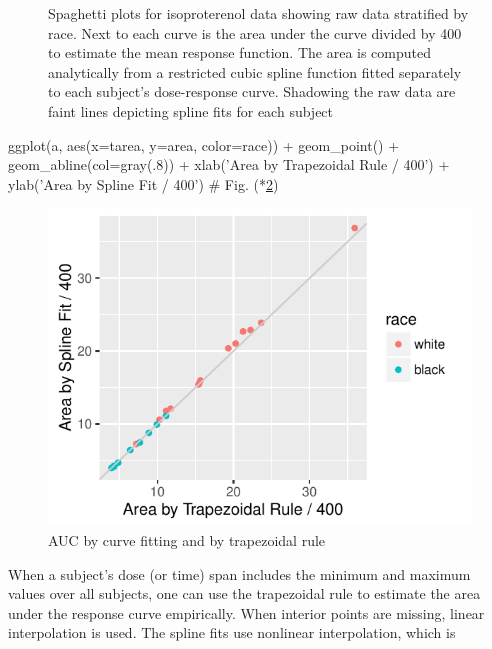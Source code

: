 \begin{Schunk}
\begin{figure}[htbp]
\caption[Spaghetti plots for isoproterenol data]{Spaghetti plots for isoproterenol data showing raw data stratified by race.  Next to each curve is the area under the curve divided by 400 to estimate the mean response function.  The area is computed analytically from a restricted cubic spline function fitted separately to each subject's dose-response curve.  Shadowing the raw data are faint lines depicting spline fits for each subject}\label{fig:serial-spag}
\end{figure}
\end{Schunk}

\begin{Schunk}
\begin{Sinput}
ggplot(a, aes(x=tarea, y=area, color=race)) + geom_point() +
  geom_abline(col=gray(.8)) +
  xlab('Area by Trapezoidal Rule / 400') +
  ylab('Area by Spline Fit / 400')          # Fig. (*\ref{fig:serial-auctwo}\ipacue*)
\end{Sinput}
\begin{figure}[htbp]

\centerline{\includegraphics{serial-auctwo-1} }

\caption[AUC by curve fitting and by trapezoidal rule]{AUC by curve fitting and by trapezoidal rule}\label{fig:serial-auctwo}
\end{figure}
\end{Schunk}
When a subject's dose (or time) span includes the minimum and maximum values
over all subjects, one can use the trapezoidal rule to estimate the area under
the response curve empirically.  When interior points are missing, linear
interpolation is used.  The spline fits use nonlinear interpolation, which is
